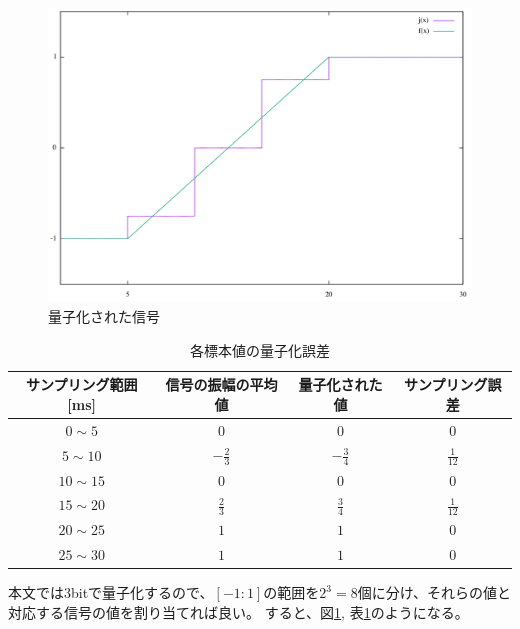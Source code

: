 \documentclass[dvipdfmx]{jsarticle}
\begin{document}
    \subsection{}
    \begin{figure}[H]
        \centering
        \includegraphics[width=0.7\hsize]{graph6.png}
        \caption{量子化された信号}
        \label{figure:6}
    \end{figure}
    \begin{table}[H]
        \centering
        \caption{各標本値の量子化誤差}
        \label{table:1}
        \begin{tabular}{c|ccc}
            サンプリング範囲[ms]&信号の振幅の平均値&量子化された値&サンプリング誤差 \\
            \hline \hline 
            $0 \sim 5$ & $0$ & $0$ & $0$ \\
            $5 \sim 10$& $-\frac{2}{3}$ & $-\frac{3}{4}$ & $\frac{1}{12}$ \\
            $10 \sim 15$ & $0$ & $0$ & $0$ \\
            $15 \sim 20$ & $ \frac{2}{3}$ & $\frac{3}{4}$ & $\frac{1}{12}$ \\
            $20 \sim 25$ & $1$ & $1$ & $0$ \\
            $25 \sim 30$ & $1$ & $1$ & $0$
        \end{tabular}
    \end{table}
    本文では3bitで量子化するので、$[-1:1]$の範囲を$2^3=8$個に分け、それらの値と対応する信号の値を割り当てれば良い。
    すると、図\ref{figure:6}, 表\ref{table:1}のようになる。
    \clearpage
\end{document}
